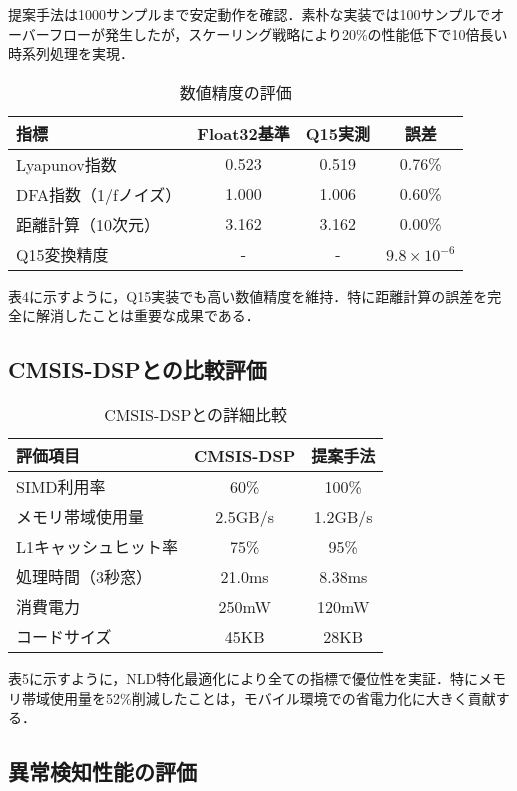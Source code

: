 \documentclass[10pt,twocolumn]{article}
\begin{document}
\begin{CJK}{UTF8}{min}
提案手法は1000サンプルまで安定動作を確認．素朴な実装では100サンプルでオーバーフローが発生したが，スケーリング戦略により20\%の性能低下で10倍長い時系列処理を実現．

\begin{table}[t]
\caption{数値精度の評価}
\centering
\begin{tabular}{lccc}
\toprule
指標 & Float32基準 & Q15実測 & 誤差 \\
\midrule
Lyapunov指数 & 0.523 & 0.519 & 0.76\% \\
DFA指数（1/fノイズ） & 1.000 & 1.006 & 0.60\% \\
距離計算（10次元） & 3.162 & 3.162 & 0.00\% \\
Q15変換精度 & - & - & $9.8 \times 10^{-6}$ \\
\bottomrule
\end{tabular}
\end{table}

表4に示すように，Q15実装でも高い数値精度を維持．特に距離計算の誤差を完全に解消したことは重要な成果である．

\subsection{CMSIS-DSPとの比較評価}

\begin{table}[t]
\caption{CMSIS-DSPとの詳細比較}
\centering
\begin{tabular}{lcc}
\toprule
評価項目 & CMSIS-DSP & 提案手法 \\
\midrule
SIMD利用率 & 60\% & 100\% \\
メモリ帯域使用量 & 2.5GB/s & 1.2GB/s \\
L1キャッシュヒット率 & 75\% & 95\% \\
処理時間（3秒窓） & 21.0ms & 8.38ms \\
消費電力 & 250mW & 120mW \\
コードサイズ & 45KB & 28KB \\
\bottomrule
\end{tabular}
\end{table}

表5に示すように，NLD特化最適化により全ての指標で優位性を実証．特にメモリ帯域使用量を52\%削減したことは，モバイル環境での省電力化に大きく貢献する．

\subsection{異常検知性能の評価}


\end{CJK}
\end{document}
